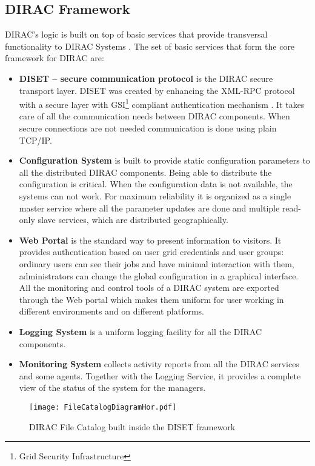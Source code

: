 \subsection{DIRAC Framework}

DIRAC’s logic is built on top of basic services that provide transversal
functionality to DIRAC Systems \cite{DISET}. The set of basic services that form the core framework for
DIRAC are: 
\begin{itemize}

\item \textbf{DISET -- secure communication protocol}
	is the DIRAC secure transport layer. DISET was created by enhancing the XML-RPC
	protocol with a secure layer with GSI\footnote{Grid Security Infrastructure} compliant authentication mechanism 
	\cite{DISET2}. 	It takes care of all the communication needs between DIRAC components. 
	When secure connections are not needed communication is done using plain TCP/IP.
	
\item \textbf{Configuration System}
	is built to provide static configuration parameters to all the distributed DIRAC components. Being able to
	distribute the configuration is critical. When the configuration data is not available, 
	the systems can not work. For maximum reliability it is organized as a single master service where 
	all the parameter updates are done and multiple read-only slave services, which are distributed geographically.

\item \textbf{Web Portal}
	is the standard way to present information to visitors. It provides authentication based on user grid
	credentials and user groups: ordinary users can see their jobs and have minimal interaction with
	them, administrators can change the global configuration in a graphical interface.
	All the monitoring and control tools of a DIRAC system are exported through the Web portal 
	which makes them uniform for user working in different environments and on different platforms.
	
\item \textbf{Logging System}
	is a uniform logging facility for all the DIRAC components.

\item \textbf{Monitoring System}
	collects activity reports from all the DIRAC services and some agents. Together
	with the Logging Service, it provides a complete view of the status of the system for the managers.
\end{itemize}
\begin{figure}[b]
	\centering
	\texttt{[image: FileCatalogDiagramHor.pdf]}
	\caption{DIRAC File Catalog built inside the DISET framework}
	\label{fig:FCDiag}
\end{figure}

